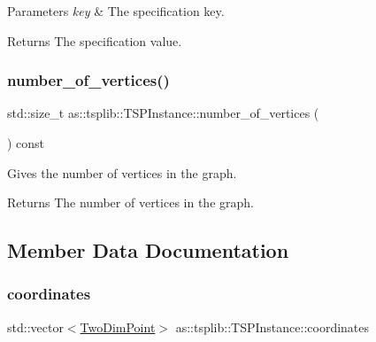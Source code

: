 \begin{DoxyParams}{Parameters}
{\em key} & The specification key. \\
\hline
\end{DoxyParams}
\begin{DoxyReturn}{Returns}
The specification value. 
\end{DoxyReturn}
\mbox{\label{classas_1_1tsplib_1_1TSPInstance_a3beae0a769669c417e8bc7d1e41a7550}} 
\subsubsection{\texorpdfstring{number\+\_\+of\+\_\+vertices()}{number\_of\_vertices()}}
{\footnotesize\ttfamily std\+::size\+\_\+t as\+::tsplib\+::\+T\+S\+P\+Instance\+::number\+\_\+of\+\_\+vertices (\begin{DoxyParamCaption}{ }\end{DoxyParamCaption}) const\hspace{0.3cm}{\ttfamily [inline]}}



Gives the number of vertices in the graph. 

\begin{DoxyReturn}{Returns}
The number of vertices in the graph. 
\end{DoxyReturn}


\subsection{Member Data Documentation}
\mbox{\label{classas_1_1tsplib_1_1TSPInstance_ad8e74403f222f9470bf320e5749e6d9a}} 
\subsubsection{\texorpdfstring{coordinates}{coordinates}}
{\footnotesize\ttfamily std\+::vector$<$\hyperlink{structas_1_1TwoDimPoint}{Two\+Dim\+Point}$>$ as\+::tsplib\+::\+T\+S\+P\+Instance\+::coordinates\hspace{0.3cm}{\ttfamily [protected]}}



